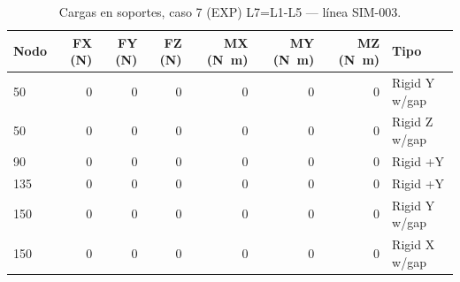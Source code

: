 \begin{table}[htbp]
  \centering
  \footnotesize
  \caption{Cargas en soportes, caso 7 (EXP) L7=L1-L5 — línea SIM-003.}
  \label{tab:restricciones-exp}
  \begin{tabular}{lrrrrrrl}
    \toprule
    Nodo & FX (\si{N}) & FY (\si{N}) & FZ (\si{N}) & MX (\si{N.m}) & MY (\si{N.m}) & MZ (\si{N.m}) & Tipo \\
    \midrule
    50 & \num{0} & \num{0} & \num{0} & \num{0} & \num{0} & \num{0} & Rigid Y w/gap \\
    50 & \num{0} & \num{0} & \num{0} & \num{0} & \num{0} & \num{0} & Rigid Z w/gap \\
    90 & \num{0} & \num{0} & \num{0} & \num{0} & \num{0} & \num{0} & Rigid +Y \\
    135 & \num{0} & \num{0} & \num{0} & \num{0} & \num{0} & \num{0} & Rigid +Y \\
    150 & \num{0} & \num{0} & \num{0} & \num{0} & \num{0} & \num{0} & Rigid Y w/gap \\
    150 & \num{0} & \num{0} & \num{0} & \num{0} & \num{0} & \num{0} & Rigid X w/gap \\
    \bottomrule
  \end{tabular}
\end{table}
